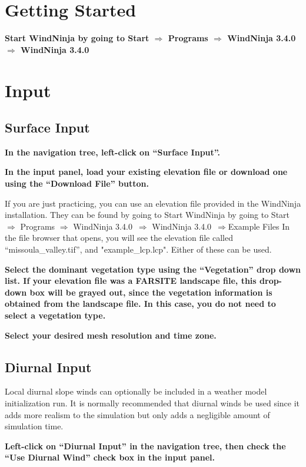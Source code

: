 \documentclass[12pt]{article}
\newcommand\vn{3.4.0}
\begin{document}
\section{Getting Started}

\textbf{\color{red}Start WindNinja by going to Start $\Rightarrow$ Programs $\Rightarrow$ WindNinja \vn\ $\Rightarrow$ WindNinja \vn\ }

\section{Input}
\subsection{Surface Input}

\textbf{\color{red} In the navigation tree, left-click on “Surface Input”.}

\textbf{\color{red} In the input panel, load your existing elevation file or download one using the “Download File” button.}

If you are just practicing, you can use an elevation file provided in the WindNinja installation.  They can be found by going to Start WindNinja by going to Start $\Rightarrow$ Programs $\Rightarrow$ WindNinja \vn\ $\Rightarrow$ WindNinja \vn\ $\Rightarrow$Example Files  In the file browser that opens, you will see the elevation file called “missoula\_valley.tif”, and "example\_lcp.lcp". Either of these can be used.

\textbf{\color{red} Select the dominant vegetation type using the “Vegetation” drop down list.  If your elevation file was a FARSITE landscape file, this drop-down box will be grayed out, since the vegetation information is obtained from the landscape file.  In this case, you do not need to select a vegetation type.}

\textbf{\color{red} Select your desired mesh resolution and time zone.}

\subsection{Diurnal Input}

Local diurnal slope winds can optionally be included in a weather model initialization run.  It is normally recommended that diurnal winds be used since it adds more realism to the simulation but only adds a negligible amount of simulation time.

\textbf{\color{red} Left-click on “Diurnal Input” in the navigation tree, then check the “Use Diurnal Wind” check box in the input panel.}
\end{document}
